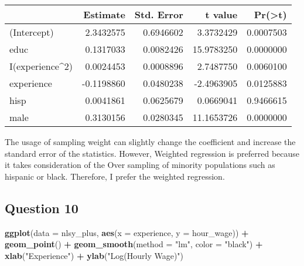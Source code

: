\documentclass[
]{article}
\newenvironment{Shaded}{\begin{snugshade}}{\end{snugshade}}
\newcommand{\DataTypeTok}[1]{\textcolor[rgb]{0.13,0.29,0.53}{#1}}
\newcommand{\DecValTok}[1]{\textcolor[rgb]{0.00,0.00,0.81}{#1}}
\newcommand{\KeywordTok}[1]{\textcolor[rgb]{0.13,0.29,0.53}{\textbf{#1}}}
\newcommand{\NormalTok}[1]{#1}
\newcommand{\OperatorTok}[1]{\textcolor[rgb]{0.81,0.36,0.00}{\textbf{#1}}}
\newcommand{\StringTok}[1]{\textcolor[rgb]{0.31,0.60,0.02}{#1}}
\begin{document}
\begin{Shaded}
\end{Shaded}

\begin{longtable}[]{@{}lrrrr@{}}
\toprule
& Estimate & Std. Error & t value &
Pr(\textgreater{}\textbar{}t\textbar{})\tabularnewline
\midrule
\endhead
(Intercept) & 2.3432575 & 0.6946602 & 3.3732429 &
0.0007503\tabularnewline
educ & 0.1317033 & 0.0082426 & 15.9783250 & 0.0000000\tabularnewline
I(experience\^{}2) & 0.0024453 & 0.0008896 & 2.7487750 &
0.0060100\tabularnewline
experience & -0.1198860 & 0.0480238 & -2.4963905 &
0.0125883\tabularnewline
hisp & 0.0041861 & 0.0625679 & 0.0669041 & 0.9466615\tabularnewline
male & 0.3130156 & 0.0280345 & 11.1653726 & 0.0000000\tabularnewline
\bottomrule
\end{longtable}

The usage of sampling weight can slightly change the coefficient and
increase the standard error of the statistics. However, Weighted
regression is preferred because it takes consideration of the Over
sampling of minority populations such as hispanic or black. Therefore, I
prefer the weighted regression.

\hypertarget{question-10}{%
\subsection{Question 10}\label{question-10}}

\begin{Shaded}
\begin{Highlighting}[]
\KeywordTok{ggplot}\NormalTok{(}\DataTypeTok{data =}\NormalTok{ nlsy_plus, }\KeywordTok{aes}\NormalTok{(}\DataTypeTok{x =}\NormalTok{ experience, }\DataTypeTok{y =}\NormalTok{ hour_wage)) }\OperatorTok{+}\StringTok{ }
\StringTok{  }\KeywordTok{geom_point}\NormalTok{() }\OperatorTok{+}\StringTok{ }
\StringTok{  }\KeywordTok{geom_smooth}\NormalTok{(}\DataTypeTok{method =} \StringTok{"lm"}\NormalTok{, }\DataTypeTok{color =} \StringTok{"black"}\NormalTok{) }\OperatorTok{+}\StringTok{ }
\StringTok{  }\KeywordTok{xlab}\NormalTok{(}\StringTok{"Experience"}\NormalTok{) }\OperatorTok{+}\StringTok{ }
\StringTok{  }\KeywordTok{ylab}\NormalTok{(}\StringTok{"Log(Hourly Wage)"}\NormalTok{)}
\end{Highlighting}
\end{Shaded}
\end{document}
